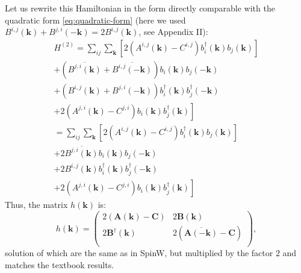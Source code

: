 \documentclass[a4paper,12pt]{article}
\begin{document}
            Let us rewrite this Hamiltonian in the form directly comparable with the quadratic form \eqref{eq:quadratic-form} 
            (here we used $B^{i,j}(\boldsymbol{k}) + B^{j,i}(-\boldsymbol{k}) = 2B^{i,j}(\boldsymbol{k})$, see Appendix II):
            \begin{multline}
                H^{(2)} = \sum_{ij}\sum_{\boldsymbol{k}}\left[2(A^{i,j}(\boldsymbol{k}) - C^{i,j})b^{\dag}_{i}(\boldsymbol{k})b_{j}(\boldsymbol{k})\right] \\
                +(\overline{B^{j,i}(\boldsymbol{k})} + \overline{B^{i,j}(-\boldsymbol{k})})b_i(\boldsymbol{k})b_{j}(-\boldsymbol{k}) \\
                +(B^{i,j}(\boldsymbol{k}) + B^{j,i}(-\boldsymbol{k}))b^{\dag}_{i}(\boldsymbol{k})b^{\dag}_{j}(-\boldsymbol{k})\\
                +\left.2(A^{j,i}(\boldsymbol{k}) - C^{j,i})b_{i}(\boldsymbol{k})b^{\dag}_{j}(\boldsymbol{k})\right] \\
                = \sum_{ij}\sum_{\boldsymbol{k}}\left[2(A^{i,j}(\boldsymbol{k}) - C^{i,j})b^{\dag}_{i}(\boldsymbol{k})b_{j}(\boldsymbol{k})\right] \\
                +2\overline{B^{j,i}(\boldsymbol{k})}b_i(\boldsymbol{k})b_{j}(-\boldsymbol{k}) \\
                +2B^{i,j}(\boldsymbol{k})b^{\dag}_{i}(\boldsymbol{k})b^{\dag}_{j}(-\boldsymbol{k})\\
                +\left.2(A^{j,i}(\boldsymbol{k}) - C^{j,i})b_{i}(\boldsymbol{k})b^{\dag}_{j}(\boldsymbol{k})\right]
            \end{multline}
            Thus, the matrix $h(\boldsymbol{k})$ is:
            \begin{equation}
                h(\boldsymbol{k}) = 
                \begin{pmatrix}
                    2(\boldsymbol{A}(\boldsymbol{k}) - \boldsymbol{C}) & 2\boldsymbol{B}(\boldsymbol{k}) \\
                    2\boldsymbol{B}^{\dag}(\boldsymbol{k}) & 2(\overline{\boldsymbol{A}(-\boldsymbol{k})} - \boldsymbol{C}) \\
                \end{pmatrix},
            \end{equation}
            solution of which are the same as in SpinW, but multiplied by the factor $2$ and matches the textbook results.
\end{document}
